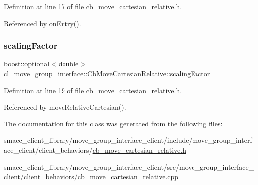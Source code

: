 Definition at line 17 of file cb\+\_\+move\+\_\+cartesian\+\_\+relative.\+h.



Referenced by on\+Entry().

\mbox{\label{classcl__move__group__interface_1_1CbMoveCartesianRelative_a2b5e5f05bce94dd3078abfd306c6ef39}} 
\subsubsection{\texorpdfstring{scaling\+Factor\+\_\+}{scalingFactor\_}}
{\footnotesize\ttfamily boost\+::optional$<$double$>$ cl\+\_\+move\+\_\+group\+\_\+interface\+::\+Cb\+Move\+Cartesian\+Relative\+::scaling\+Factor\+\_\+}



Definition at line 19 of file cb\+\_\+move\+\_\+cartesian\+\_\+relative.\+h.



Referenced by move\+Relative\+Cartesian().



The documentation for this class was generated from the following files\+:\begin{DoxyCompactItemize}
\item 
smacc\+\_\+client\+\_\+library/move\+\_\+group\+\_\+interface\+\_\+client/include/move\+\_\+group\+\_\+interface\+\_\+client/client\+\_\+behaviors/\hyperlink{cb__move__cartesian__relative_8h}{cb\+\_\+move\+\_\+cartesian\+\_\+relative.\+h}\item 
smacc\+\_\+client\+\_\+library/move\+\_\+group\+\_\+interface\+\_\+client/src/move\+\_\+group\+\_\+interface\+\_\+client/client\+\_\+behaviors/\hyperlink{cb__move__cartesian__relative_8cpp}{cb\+\_\+move\+\_\+cartesian\+\_\+relative.\+cpp}\end{DoxyCompactItemize}
